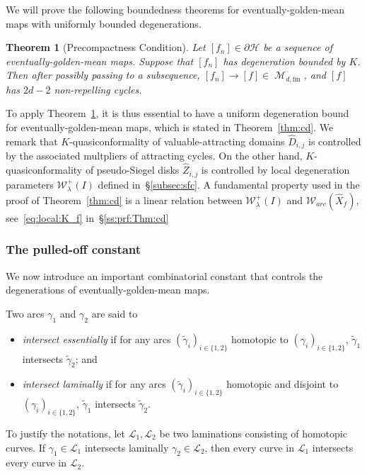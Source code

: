 \documentclass[11pt, reqno]{amsart}
\numberwithin{equation}{section}
\theoremstyle{plain}
\newtheorem{theorem}{Theorem}[section]
\theoremstyle{theorem}
\theoremstyle{plain}
\theoremstyle{definition}
\newcommand{\fm}{\text{fm}}
\DeclareMathOperator{\M}{\mathcal{M}}
\numberwithin{figure}{section}
\begin{document}
We will prove the following boundedness theorems for eventually-golden-mean maps with uniformly bounded degenerations.
\begin{theorem}[Precompactness Condition]\label{thm:ubd}
    Let $[f_n] \in \partial \mathcal{H}$ be a sequence of eventually-golden-mean maps.
    Suppose that $[f_n]$ has degeneration bounded by $K$.
    Then after possibly passing to a subsequence, $[f_n] \to [f] \in \M_{d, \fm}$, and $[f]$ has $2d-2$ non-repelling cycles.
\end{theorem}

To apply Theorem~\ref{thm:ubd}, it is thus essential to have a uniform degeneration bound for eventually-golden-mean maps, which is stated in Theorem~\ref{thm:cd}. We remark that $K$-quasiconformality of valuable-attracting domains $\widehat{D}_{i,j}$ is controlled by the associated multpliers of attracting cycles. On the other hand, $K$-quasiconformality of pseudo-Siegel disks $\widehat{Z}_{i,j}$ is controlled by local degeneration parameters $\mathcal W^+_\lambda(I)$ defined in~\S\ref{subsec:sfc}. A fundamental property used in the proof of Theorem~\ref{thm:cd} is a linear relation between $\mathcal W^+_\lambda(I)$ and $\mathcal{W}_{arc}(\widehat X_f)$, see~\eqref{eq:local:K_f} in~\S\ref{ss:prf:Thm:cd}


\subsubsection{The pulled-off constant}\label{sss:constant:Pulloff}
We now introduce an important combinatorial constant that controls the degenerations of eventually-golden-mean maps.

Two arcs $\gamma_1$ and $\gamma_2$ are said to 
\begin{itemize}
    \item {\em intersect essentially} if for any arcs $(\widetilde{\gamma}_i)_{i\in \{1,2\}}$ homotopic to $(\gamma_i)_{i\in \{1,2\}}$, $\widetilde{\gamma}_1$ intersects $\widetilde{\gamma}_2$; and
    \item {\em intersect laminally} if for any arcs $(\widetilde{\gamma}_i)_{i\in \{1,2\}}$ homotopic and disjoint to $(\gamma_i)_{i\in \{1,2\}}$, $\widetilde{\gamma}_1$ intersects $\widetilde{\gamma}_2$.
\end{itemize}

To justify the notations, let $\mathcal L_1,\mathcal L_2$ be two laminations consisting of homotopic curves. If $\gamma_1\in \mathcal L_1$ intersects laminally $\gamma_2\in \mathcal L_2$, then every curve in $\mathcal L_1$ intersects every curve in $\mathcal L_2$.
\end{document}
